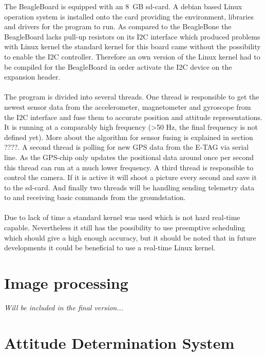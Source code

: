 The BeagleBoard is equipped with an 8~GB sd-card. A debian based Linux
operation system is installed onto the card providing the environment,
libraries and drivers for the program to run. As compared to the BeagleBone the
BeagleBoard lacks pull-up resistors on its I2C interface which produced
problems with Linux kernel the standard kernel for this board came without the
possibility to enable the I2C controller. Therefore an own version of the Linux
kernel had to be compiled for the BeagleBoard in order activate the I2C device
on the expansion header. 
\\
\\
The program is divided into several threads. One thread is responsible to get
the newest sensor data from the accelerometer, magnetometer and gyroscope
from the I2C interface and fuse them to accurate position and attitude
representations. It is running at a comparably high frequency (>50 Hz, the final
frequency is not defined yet). More about the algorithm for sensor fusing is
explained in section ????. A second thread is polling for new GPS data from
the E-TAG via serial line. As the GPS-chip only updates the positional data
around once per second this thread can run at a much lower frequency.
A third thread is responsible to control the camera. If it is active it will
shoot a picture every second and save it to the sd-card. And finally two
threads will be handling sending telemetry data to and receiving basic commands
from the groundstation.
\\
\\
Due to lack of time a standard kernel was used which is not hard real-time
capable. Nevertheless it still has the possibility to use preemptive scheduling
which should give a high enough accuracy, but it should be noted that in future
developments it could be beneficial to use a real-time Linux kernel. 

\FloatBarrier
\section{Image processing}

\textit{Will be included in the final version...}

\FloatBarrier
\section{Attitude Determination System}

